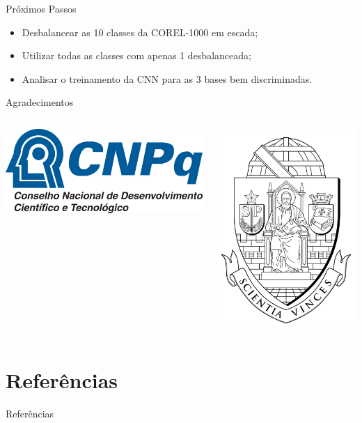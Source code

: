 \documentclass{beamer}
\begin{document}
\begin{frame}{Próximos Passos}
\setlength\leftmargini{0em}
\justifying
  \begin{itemize}
  \item Desbalancear as 10 classes da COREL-1000 em escada;
  \item Utilizar todas as classes com apenas 1 desbalanceada;
  \item Analisar o treinamento da CNN para as 3 bases bem discriminadas.
  \end{itemize}
\end{frame}
\begin{frame}{Agradecimentos}
\begin{columns}
  \begin{column}{0.5\textwidth}
  \centering
    \includegraphics[width=0.6\columnwidth]{figuras/cnpqLogo.jpg}
  \end{column}
  \begin{column}{0.5\textwidth}
  \centering
    \includegraphics[width=0.6\columnwidth]{figuras/brasao_usp_pb}
  \end{column}
\end{columns}
\end{frame}
\section{Referências}
\begin{frame}{Referências}
\end{frame}
\begin{frame}[plain]
  \maketitle
\end{frame}
\end{document}
